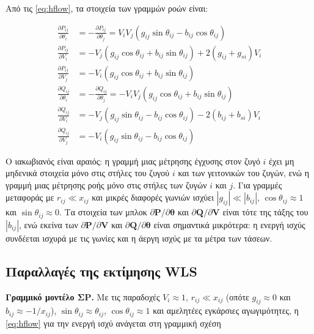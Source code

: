 Από τις \eqref{eq:hflow}, τα στοιχεία των γραμμών ροών είναι:

\begin{align}
\frac{\partial P_{ij}}{\partial \theta_i} &= -\frac{\partial P_{ij}}{\partial \theta_j}
  = V_i V_j \left( g_{ij}\sin\theta_{ij} - b_{ij}\cos\theta_{ij} \right) \\
\frac{\partial P_{ij}}{\partial V_i} &= -V_j \left( g_{ij}\cos\theta_{ij} + b_{ij}\sin\theta_{ij} \right) + 2\left( g_{ij} + g_{si} \right) V_i \\
\frac{\partial P_{ij}}{\partial V_j} &= -V_i \left( g_{ij}\cos\theta_{ij} + b_{ij}\sin\theta_{ij} \right) \\
\frac{\partial Q_{ij}}{\partial \theta_i} &= -\frac{\partial Q_{ij}}{\partial \theta_j}
  = -V_i V_j \left( g_{ij}\cos\theta_{ij} + b_{ij}\sin\theta_{ij} \right) \\
\frac{\partial Q_{ij}}{\partial V_i} &= -V_j \left( g_{ij}\sin\theta_{ij} - b_{ij}\cos\theta_{ij} \right) - 2\left( b_{ij} + b_{si} \right) V_i \\
\frac{\partial Q_{ij}}{\partial V_j} &= -V_i \left( g_{ij}\sin\theta_{ij} - b_{ij}\cos\theta_{ij} \right)
\label{eq:jacflow}
\end{align}

Ο ιακωβιανός είναι αραιός: η γραμμή μιας μέτρησης έγχυσης στον ζυγό $i$ έχει μη μηδενικά
στοιχεία μόνο στις στήλες του ζυγού $i$ και των γειτονικών του ζυγών, ενώ η γραμμή μιας
μέτρησης ροής μόνο στις στήλες των ζυγών $i$ και $j$. Για γραμμές μεταφοράς με
$r_{ij} \ll x_{ij}$ και μικρές διαφορές γωνιών ισχύει $|g_{ij}| \ll |b_{ij}|$,
$\cos\theta_{ij} \approx 1$ και $\sin\theta_{ij} \approx 0$. Τα στοιχεία των μπλοκ
$\partial\mathbf{P}/\partial\boldsymbol{\theta}$ και $\partial\mathbf{Q}/\partial\mathbf{V}$
είναι τότε της τάξης του $|b_{ij}|$, ενώ εκείνα των $\partial\mathbf{P}/\partial\mathbf{V}$ και
$\partial\mathbf{Q}/\partial\boldsymbol{\theta}$ είναι σημαντικά μικρότερα: η ενεργή ισχύς
συνδέεται ισχυρά με τις γωνίες και η άεργη ισχύς με τα μέτρα των τάσεων.

\subsection{Παραλλαγές της εκτίμησης WLS}

\textbf{Γραμμικό μοντέλο ΣΡ.} Με τις παραδοχές $V_i \approx 1$, $r_{ij} \ll x_{ij}$ (οπότε
$g_{ij} \approx 0$ και $b_{ij} \approx -1/x_{ij}$), $\sin\theta_{ij} \approx \theta_{ij}$,
$\cos\theta_{ij} \approx 1$ και αμελητέες εγκάρσιες αγωγιμότητες, η \eqref{eq:hflow} για την
ενεργή ισχύ ανάγεται στη γραμμική σχέση

